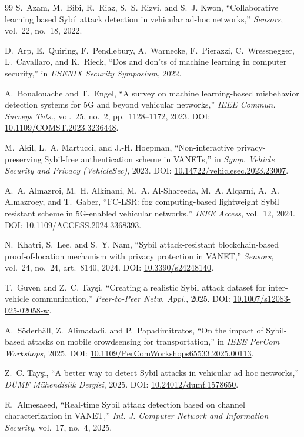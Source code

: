 \documentclass[journal,twoside]{IEEEtran}
\begin{document}
\begin{thebibliography}{99}
 S.~Azam, M.~Bibi, R.~Riaz, S.~S. Rizvi, and S.~J. Kwon, ``Collaborative learning based Sybil attack detection in vehicular ad-hoc networks,'' \emph{Sensors}, vol.~22, no.~18, 2022.

 D.~Arp, E.~Quiring, F.~Pendlebury, A.~Warnecke, F.~Pierazzi, C.~Wressnegger, L.~Cavallaro, and K.~Rieck, ``Dos and don'ts of machine learning in computer security,'' in \emph{USENIX Security Symposium}, 2022.

 A.~Boualouache and T.~Engel, ``A survey on machine learning-based misbehavior detection systems for 5G and beyond vehicular networks,'' \emph{IEEE Commun. Surveys Tuts.}, vol.~25, no.~2, pp.~1128--1172, 2023. DOI: \url{10.1109/COMST.2023.3236448}.

 M.~Akil, L.~A. Martucci, and J.-H. Hoepman, ``Non-interactive privacy-preserving Sybil-free authentication scheme in VANETs,'' in \emph{Symp. Vehicle Security and Privacy (VehicleSec)}, 2023. DOI: \url{10.14722/vehiclesec.2023.23007}.

 A.~A. Almazroi, M.~H. Alkinani, M.~A. Al-Shareeda, M.~A. Alqarni, A.~A. Almazroey, and T.~Gaber, ``FC-LSR: fog computing-based lightweight Sybil resistant scheme in 5G-enabled vehicular networks,'' \emph{IEEE Access}, vol.~12, 2024. DOI: \url{10.1109/ACCESS.2024.3368393}.

 N.~Khatri, S.~Lee, and S.~Y. Nam, ``Sybil attack-resistant blockchain-based proof-of-location mechanism with privacy protection in VANET,'' \emph{Sensors}, vol.~24, no.~24, art.~8140, 2024. DOI: \url{10.3390/s24248140}.

 T.~Guven and Z.~C. Tay\c{s}i, ``Creating a realistic Sybil attack dataset for inter-vehicle communication,'' \emph{Peer-to-Peer Netw. Appl.}, 2025. DOI: \url{10.1007/s12083-025-02058-w}.

 A.~S\"oderh\"all, Z.~Alimadadi, and P.~Papadimitratos, ``On the impact of Sybil-based attacks on mobile crowdsensing for transportation,'' in \emph{IEEE PerCom Workshops}, 2025. DOI: \url{10.1109/PerComWorkshops65533.2025.00113}.

 Z.~C. Tay\c{s}i, ``A better way to detect Sybil attacks in vehicular ad hoc networks,'' \emph{D\"UMF M\"uhendislik Dergisi}, 2025. DOI: \url{10.24012/dumf.1578650}.

 R.~Almesaeed, ``Real-time Sybil attack detection based on channel characterization in VANET,'' \emph{Int. J. Computer Network and Information Security}, vol.~17, no.~4, 2025.


\end{thebibliography}
\end{document}
